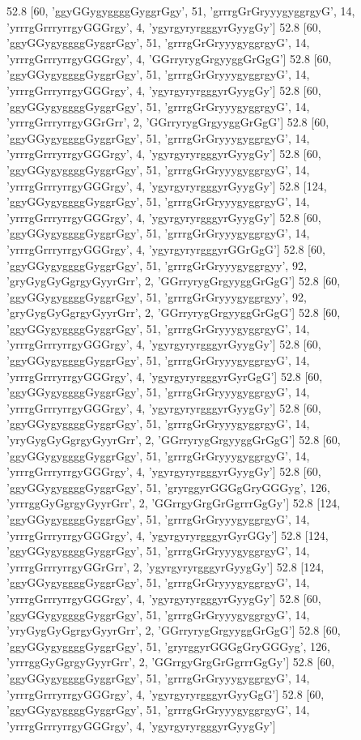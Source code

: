 52.8 [60, 'ggyGGygyggggGyggrGgy', 51, 'grrrgGrGryyygyggrgyG', 14, 'yrrrgGrrryrrgyGGGrgy', 4, 'ygyrgyryrgggyrGyygGy']
52.8 [60, 'ggyGGygyggggGyggrGgy', 51, 'grrrgGrGryyygyggrgyG', 14, 'yrrrgGrrryrrgyGGGrgy', 4, 'GGrryrygGrgyyggGrGgG']
52.8 [60, 'ggyGGygyggggGyggrGgy', 51, 'grrrgGrGryyygyggrgyG', 14, 'yrrrgGrrryrrgyGGGrgy', 4, 'ygyrgyryrgggyrGyygGy']
52.8 [60, 'ggyGGygyggggGyggrGgy', 51, 'grrrgGrGryyygyggrgyG', 14, 'yrrrgGrrryrrgyGGrGrr', 2, 'GGrryrygGrgyyggGrGgG']
52.8 [60, 'ggyGGygyggggGyggrGgy', 51, 'grrrgGrGryyygyggrgyG', 14, 'yrrrgGrrryrrgyGGGrgy', 4, 'ygyrgyryrgggyrGyygGy']
52.8 [60, 'ggyGGygyggggGyggrGgy', 51, 'grrrgGrGryyygyggrgyG', 14, 'yrrrgGrrryrrgyGGGrgy', 4, 'ygyrgyryrgggyrGyygGy']
52.8 [124, 'ggyGGygyggggGyggrGgy', 51, 'grrrgGrGryyygyggrgyG', 14, 'yrrrgGrrryrrgyGGGrgy', 4, 'ygyrgyryrgggyrGyygGy']
52.8 [60, 'ggyGGygyggggGyggrGgy', 51, 'grrrgGrGryyygyggrgyG', 14, 'yrrrgGrrryrrgyGGGrgy', 4, 'ygyrgyryrgggyrGGrGgG']
52.8 [60, 'ggyGGygyggggGyggrGgy', 51, 'grrrgGrGryyygyggrgyy', 92, 'gryGygGyGgrgyGyyrGrr', 2, 'GGrryrygGrgyyggGrGgG']
52.8 [60, 'ggyGGygyggggGyggrGgy', 51, 'grrrgGrGryyygyggrgyy', 92, 'gryGygGyGgrgyGyyrGrr', 2, 'GGrryrygGrgyyggGrGgG']
52.8 [60, 'ggyGGygyggggGyggrGgy', 51, 'grrrgGrGryyygyggrgyG', 14, 'yrrrgGrrryrrgyGGGrgy', 4, 'ygyrgyryrgggyrGyygGy']
52.8 [60, 'ggyGGygyggggGyggrGgy', 51, 'grrrgGrGryyygyggrgyG', 14, 'yrrrgGrrryrrgyGGGrgy', 4, 'ygyrgyryrgggyrGyrGgG']
52.8 [60, 'ggyGGygyggggGyggrGgy', 51, 'grrrgGrGryyygyggrgyG', 14, 'yrrrgGrrryrrgyGGGrgy', 4, 'ygyrgyryrgggyrGyygGy']
52.8 [60, 'ggyGGygyggggGyggrGgy', 51, 'grrrgGrGryyygyggrgyG', 14, 'yryGygGyGgrgyGyyrGrr', 2, 'GGrryrygGrgyyggGrGgG']
52.8 [60, 'ggyGGygyggggGyggrGgy', 51, 'grrrgGrGryyygyggrgyG', 14, 'yrrrgGrrryrrgyGGGrgy', 4, 'ygyrgyryrgggyrGyygGy']
52.8 [60, 'ggyGGygyggggGyggrGgy', 51, 'gryrggyrGGGgGryGGGyg', 126, 'yrrrggGyGgrgyGyyrGrr', 2, 'GGrrgyGrgGrGgrrrGgGy']
52.8 [124, 'ggyGGygyggggGyggrGgy', 51, 'grrrgGrGryyygyggrgyG', 14, 'yrrrgGrrryrrgyGGGrgy', 4, 'ygyrgyryrgggyrGyrGGy']
52.8 [124, 'ggyGGygyggggGyggrGgy', 51, 'grrrgGrGryyygyggrgyG', 14, 'yrrrgGrrryrrgyGGrGrr', 2, 'ygyrgyryrgggyrGyygGy']
52.8 [124, 'ggyGGygyggggGyggrGgy', 51, 'grrrgGrGryyygyggrgyG', 14, 'yrrrgGrrryrrgyGGGrgy', 4, 'ygyrgyryrgggyrGyygGy']
52.8 [60, 'ggyGGygyggggGyggrGgy', 51, 'grrrgGrGryyygyggrgyG', 14, 'yryGygGyGgrgyGyyrGrr', 2, 'GGrryrygGrgyyggGrGgG']
52.8 [60, 'ggyGGygyggggGyggrGgy', 51, 'gryrggyrGGGgGryGGGyg', 126, 'yrrrggGyGgrgyGyyrGrr', 2, 'GGrrgyGrgGrGgrrrGgGy']
52.8 [60, 'ggyGGygyggggGyggrGgy', 51, 'grrrgGrGryyygyggrgyG', 14, 'yrrrgGrrryrrgyGGGrgy', 4, 'ygyrgyryrgggyrGyyGgG']
52.8 [60, 'ggyGGygyggggGyggrGgy', 51, 'grrrgGrGryyygyggrgyG', 14, 'yrrrgGrrryrrgyGGGrgy', 4, 'ygyrgyryrgggyrGyygGy']

